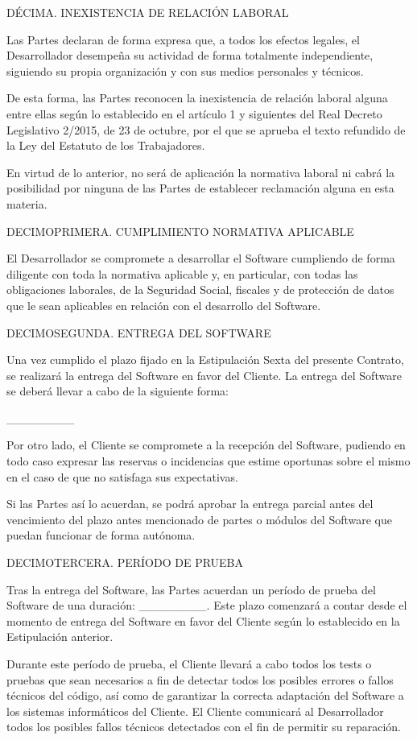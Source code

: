 \documentclass[a4paper,11pt]{report}
\begin{document}
	DÉCIMA. INEXISTENCIA DE RELACIÓN LABORAL
	
	Las Partes declaran de forma expresa que, a todos los efectos legales,
	el Desarrollador desempeña su actividad de forma totalmente
	independiente, siguiendo su propia organización y con sus medios
	personales y técnicos.
	
	De esta forma, las Partes reconocen la inexistencia de relación laboral
	alguna entre ellas según lo establecido en el artículo 1 y siguientes
	del Real Decreto Legislativo 2/2015, de 23 de octubre, por el que se
	aprueba el texto refundido de la Ley del Estatuto de los Trabajadores.
	
	En virtud de lo anterior, no será de aplicación la normativa laboral ni
	cabrá la posibilidad por ninguna de las Partes de establecer reclamación
	alguna en esta materia.
	
	DECIMOPRIMERA. CUMPLIMIENTO NORMATIVA APLICABLE
	
	El Desarrollador se compromete a desarrollar el Software cumpliendo de
	forma diligente con toda la normativa aplicable y, en particular, con
	todas las obligaciones laborales, de la Seguridad Social, fiscales y de
	protección de datos que le sean aplicables en relación con el desarrollo
	del Software.
	
	DECIMOSEGUNDA. ENTREGA DEL SOFTWARE
	
	Una vez cumplido el plazo fijado en la Estipulación Sexta del presente
	Contrato, se realizará la entrega del Software en favor del Cliente. La
	entrega del Software se deberá llevar a cabo de la siguiente forma:
	
	\_\_\_\_\_\_\_\_
	
	Por otro lado, el Cliente se compromete a la recepción del Software,
	pudiendo en todo caso expresar las reservas o incidencias que estime
	oportunas sobre el mismo en el caso de que no satisfaga sus
	expectativas.
	
	Si las Partes así lo acuerdan, se podrá aprobar la entrega parcial antes
	del vencimiento del plazo antes mencionado de partes o módulos del
	Software que puedan funcionar de forma autónoma.
	
	DECIMOTERCERA. PERÍODO DE PRUEBA
	
	Tras la entrega del Software, las Partes acuerdan un período de prueba
	del Software de una duración: \_\_\_\_\_\_\_\_. Este plazo comenzará a contar
	desde el momento de entrega del Software en favor del Cliente según lo
	establecido en la Estipulación anterior.
	
	Durante este período de prueba, el Cliente llevará a cabo todos los
	tests o pruebas que sean necesarios a fin de detectar todos los posibles
	errores o fallos técnicos del código, así como de garantizar la correcta
	adaptación del Software a los sistemas informáticos del Cliente. El
	Cliente comunicará al Desarrollador todos los posibles fallos técnicos
	detectados con el fin de permitir su reparación.
	
\end{document}
